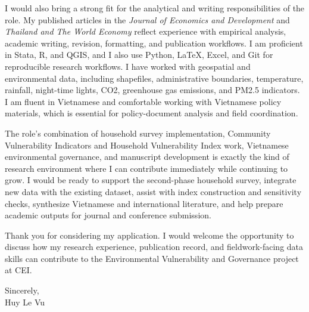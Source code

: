 \documentclass[10pt]{article}
\begin{document}
I would also bring a strong fit for the analytical and writing responsibilities of the role. My published articles in the \textit{Journal of Economics and Development} and \textit{Thailand and The World Economy} reflect experience with empirical analysis, academic writing, revision, formatting, and publication workflows. I am proficient in Stata, R, and QGIS, and I also use Python, \LaTeX, Excel, and Git for reproducible research workflows. I have worked with geospatial and environmental data, including shapefiles, administrative boundaries, temperature, rainfall, night-time lights, CO2, greenhouse gas emissions, and PM2.5 indicators. I am fluent in Vietnamese and comfortable working with Vietnamese policy materials, which is essential for policy-document analysis and field coordination.

The role's combination of household survey implementation, Community Vulnerability Indicators and Household Vulnerability Index work, Vietnamese environmental governance, and manuscript development is exactly the kind of research environment where I can contribute immediately while continuing to grow. I would be ready to support the second-phase household survey, integrate new data with the existing dataset, assist with index construction and sensitivity checks, synthesize Vietnamese and international literature, and help prepare academic outputs for journal and conference submission.

Thank you for considering my application. I would welcome the opportunity to discuss how my research experience, publication record, and fieldwork-facing data skills can contribute to the Environmental Vulnerability and Governance project at CEI.

Sincerely,\\
Huy Le Vu
\end{document}
